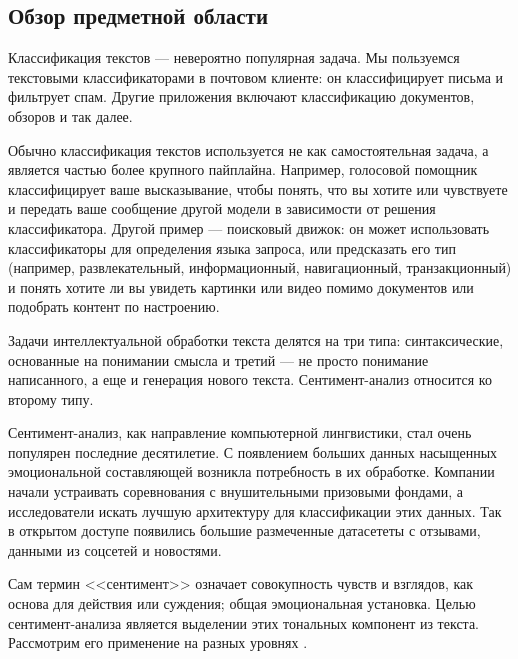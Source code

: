 \subsection{Обзор предметной области}


\par
Классификация текстов --- невероятно популярная задача. Мы пользуемся текстовыми классификаторами в почтовом клиенте: он классифицирует письма и фильтрует спам. Другие приложения включают классификацию документов, обзоров и так далее.

\bigskip\par
Обычно классификация текстов используется не как самостоятельная задача, а является частью более крупного пайплайна. Например, голосовой помощник классифицирует ваше высказывание, чтобы понять, что вы хотите или чувствуете и передать ваше сообщение другой модели в зависимости от решения классификатора.  Другой пример --- поисковый движок: он может использовать классификаторы для определения языка запроса, или предсказать его тип (например, развлекательный, информационный, навигационный, транзакционный) и понять хотите ли вы увидеть картинки или видео помимо документов или подобрать контент по настроению.

\bigskip
Задачи интеллектуальной обработки текста делятся на три типа: синтаксические, основанные на понимании смысла и третий --- не просто понимание написанного, а еще и генерация нового текста. Сентимент-анализ относится ко второму типу.

\bigskip\par
Сентимент-анализ, как направление компьютерной лингвистики, стал очень популярен последние десятилетие. С
появлением больших данных насыщенных эмоциональной составляющей возникла потребность в их обработке. Компании
начали устраивать соревнования с внушительными призовыми фондами, а исследователи искать лучшую архитектуру
для классификации этих данных. Так в открытом доступе появились большие размеченные датасететы с отзывами,
данными из соцсетей и новостями.

\bigskip\par
Сам термин <<сентимент>> означает совокупность чувств и взглядов, как основа для действия или суждения; общая
эмоциональная установка. Целью сентимент-анализа является выделении этих тональных компонент из текста.
Рассмотрим его применение на разных уровнях \cite{Semina}.

